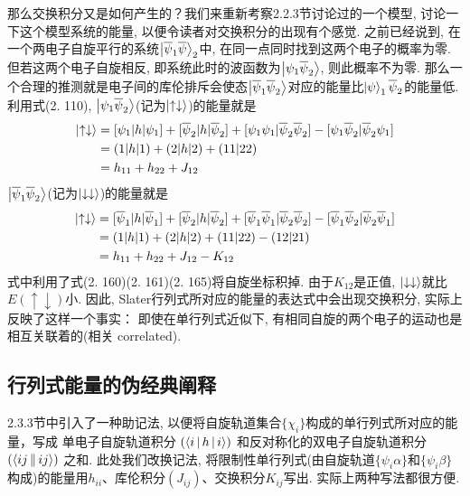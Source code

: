 那么交换积分又是如何产生的？我们来重新考察2.2.3节讨论过的一个模型, 
讨论一下这个模型系统的能量, 
以便令读者对交换积分的出现有个感觉. 
之前已经说到, 
在一个两电子自旋平行的系统$\Ket{\overline{\psi}_1\overline{\psi}}_2$中, 
在同一点同时找到这两个电子的概率为零. 
但若这两个电子自旋相反, 
即系统此时的波函数为$\Ket{{\psi}_1\overline{\psi}_2}$, 
则此概率不为零. 
那么一个合理的推测就是电子间的库伦排斥会使态$\Ket{\overline{\psi}_1\overline{\psi}_2}$对应的能量比$\Ket{\psi}_1\overline{\psi}_2$的能量低. 
利用式(2.
110), 
$\Ket{\psi_1\overline{\psi}_2}$(记为$\Ket{\uparrow\downarrow}$)的能量就是
\begin{align}
\Ket{\uparrow\downarrow} & =[\psi_1|h|\psi_1] + [\overline{\psi}_2|h|\overline{\psi}_2] + [\psi_1\psi_1|\overline{\psi}_2\overline{\psi}_2] - [\psi_1\overline{\psi}_2|\overline{\psi}_2\psi_1]\notag\\
& = (1|h|1) + (2|h|2) + (11|22)\notag\\
& = h_{11} + h_{22} + J_{12}
\end{align}
$\Ket{\overline{\psi}_1\overline{\psi}_2}$(记为$\Ket{\downarrow\downarrow}$)的能量就是
\begin{align}
\Ket{\uparrow\downarrow} & =[\overline{\psi}_1|h|\overline{\psi}_1] + [\overline{\psi}_2|h|\overline{\psi}_2] + [\overline{\psi}_1\overline{\psi}_1|\overline{\psi}_2\overline{\psi}_2] - [\overline{\psi}_1\overline{\psi}_2|\overline{\psi}_2\overline{\psi}_1]\notag\\
& = (1|h|1) + (2|h|2) + (11|22) - (12|21)\notag\\
& = h_{11} + h_{22} + J_{12} - K_{12}
\end{align}
式中利用了式(2.
160)(2.
161)(2.
165)将自旋坐标积掉. 
由于$K_{12}$是正值, 
$\Ket{\downarrow\downarrow}$就比$E(\uparrow\downarrow)$小. 
因此, 
Slater行列式所对应的能量的表达式中会出现交换积分, 
实际上反映了这样一个事实： 即使在单行列式近似下, 
有相同自旋的两个电子的运动也是相互关联着的(相关 correlated).

\subsection{行列式能量的伪经典阐释}
\label{sec2.3.7}
2.3.3节中引入了一种助记法, 
以便将自旋轨道集合$\{\chi_i\}$构成的单行列式所对应的能量，写成
单电子自旋轨道积分 $(\Braket{i|h|i})$ 和反对称化的双电子自旋轨道积分 $(\Braket{ij||ij})$ 之和. 
此处我们改换记法, 
将限制性单行列式(由自旋轨道$\{ \psi_i\alpha \}$和$\{ \psi_i\beta \}$构成)的能量用$h_{ii}$、库伦积分$(J_{ij})$、交换积分$K_{ij}$写出. 
实际上两种写法都很方便.

